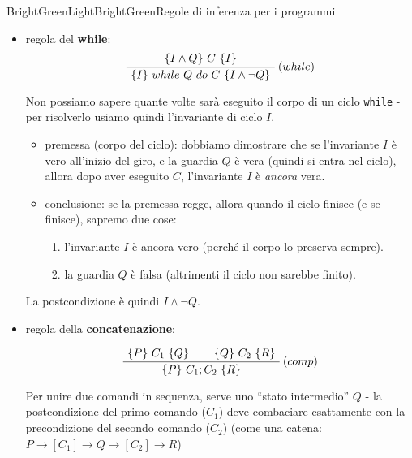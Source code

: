 \documentclass[a4paper,11pt]{report}
\begin{document}
\begin{cdefframe}{BrightGreenLight}{BrightGreen}{Regole di inferenza per i programmi}
\begin{itemize}
{
\color{CadetBlue}
Per dimostrare che l'intero \texttt{if} porta alla postcondizione, dobbiamo dimostrare due sotto-condizioni:
    \begin{enumerate}
        \item se vale la precondizione \( P \) e la guardia \( Q \) è vera, eseguendo \( C_1 \) arrivo a \( R \).
        \item se vale la precondizione \( P \) e la guardia \( Q \) è falsa (\( \neg Q \)), eseguendo \( C_2 \) arrivo comunque a \( R \).
    \end{enumerate}
    Se entrambi i rami convergono su \( R \), allora l'intero costrutto è corretto.
}

    \item regola del \textbf{while}:
\[
\AxiomC{$\{I \wedge Q\} \ C \ \{I\}$}
\RightLabel{$(while)$}
\UnaryInfC{$\{I\} \ while \ Q \ do \ C \ \{I \wedge \neg Q\}$}
\DisplayProof
\]

{
\color{CadetBlue}
Non possiamo sapere quante volte sarà eseguito il corpo di un ciclo \texttt{while} - per risolverlo usiamo quindi l'invariante di ciclo \( I \).
    \begin{itemize}
        \item premessa (corpo del ciclo): dobbiamo dimostrare che se l'invariante \( I \) è vero all'inizio del giro, e la guardia \( Q \) è vera (quindi si entra nel ciclo), allora dopo aver eseguito \( C \), l'invariante \( I \) è \textit{ancora} vera.
        \item conclusione: se la premessa regge, allora quando il ciclo finisce (e se finisce), sapremo due cose:
        \begin{enumerate}
            \item l'invariante \( I \) è ancora vero (perché il corpo lo preserva sempre).
            \item la guardia \( Q \) è falsa (altrimenti il ciclo non sarebbe finito).
        \end{enumerate}
    \end{itemize}
    La postcondizione è quindi \( I \wedge \neg Q \).
}

    \item regola della \textbf{concatenazione}:

\[
\AxiomC{$\{P\} \ C_1 \ \{Q\}$}
\AxiomC{$\{Q\} \ C_2 \ \{R\}$}
\RightLabel{$(comp)$}
\BinaryInfC{$\{P\} \ C_1 ; C_2 \ \{R\}$}
\DisplayProof
\]

{\color{CadetBlue}Per unire due comandi in sequenza, serve uno ``stato intermedio'' \( Q \) - la postcondizione del primo comando (\( C_1 \)) deve combaciare esattamente con la precondizione del secondo comando (\( C_2 \)) (come una catena: \( P \to [C_1] \to Q \to [C_2] \to R \))}

\end{itemize}

\end{cdefframe}
\end{document}
